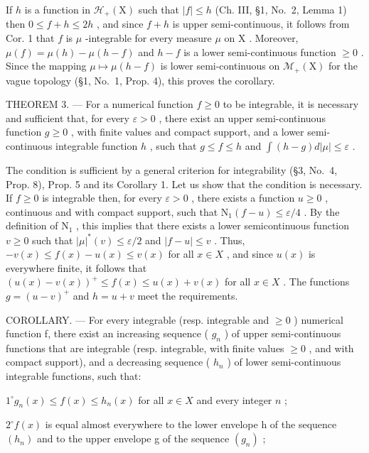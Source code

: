 If \(h\) is a function in \(\mathcal{H}_{+}(\mathrm{X})\) such that \(|f| \leqslant h\) (Ch. III, §1, No.~2, Lemma 1) then \(0 \leqslant f + h \leqslant 2h\) , and since \(f + h\) is upper semi-continuous, it follows from Cor. 1 that \(f\) is \(\mu\) -integrable for every measure \(\mu\) on \(\mathrm{X}\) . Moreover, \(\mu(f) = \mu(h) - \mu(h - f)\) and \(h - f\) is a lower semi-continuous function \(\geqslant 0\) . Since the mapping \(\mu \mapsto \mu(h - f)\) is lower semi-continuous on \(\mathcal{M}_{+}(\mathrm{X})\) for the vague topology (§1, No.~1, Prop. 4), this proves the corollary.

THEOREM 3. --- For a numerical function \(f \geqslant 0\) to be integrable, it is necessary and sufficient that, for every \(\varepsilon > 0\) , there exist an upper semi-continuous function \(g \geqslant 0\) , with finite values and compact support, and a lower semi-continuous integrable function \(h\) , such that \(g \leqslant f \leqslant h\) and \(\int (h - g) d|\mu| \leqslant \varepsilon\) .

The condition is sufficient by a general criterion for integrability (§3, No.~4, Prop. 8), Prop. 5 and its Corollary 1. Let us show that the condition is necessary. If \(f \geqslant 0\) is integrable then, for every \(\varepsilon > 0\) , there exists a function \(u \geqslant 0\) , continuous and with compact support, such that \(\mathrm{N}_1(f - u) \leqslant \varepsilon / 4\) . By the definition of \(\mathrm{N}_1\) , this implies that there exists a lower semicontinuous function \(v \geqslant 0\) such that \(|\mu|^*(v) \leqslant \varepsilon / 2\) and \(|f - u| \leqslant v\) . Thus, \(-v(x) \leqslant f(x) - u(x) \leqslant v(x)\) for all \(x \in X\) , and since \(u(x)\) is everywhere finite, it follows that \((u(x) - v(x))^+ \leqslant f(x) \leqslant u(x) + v(x)\) for all \(x \in X\) . The functions \(g = (u - v)^+\) and \(h = u + v\) meet the requirements.

COROLLARY. --- For every integrable (resp. integrable and \(\geqslant0\) ) numerical function f, there exist an increasing sequence ( \(g_{n}\) ) of upper semi-continuous functions that are integrable (resp. integrable, with finite values \(\geqslant0\) , and with compact support), and a decreasing sequence ( \(h_{n}\) ) of lower semi-continuous integrable functions, such that:

\(1^{\circ} g_{n}(x) \leqslant f(x) \leqslant h_{n}(x)\) for all \(x \in X\) and every integer \(n\) ;

\(2^{\circ} f(x)\) is equal almost everywhere to the lower envelope h of the sequence \((h_{n})\) and to the upper envelope g of the sequence \((g_{n})\) ;


